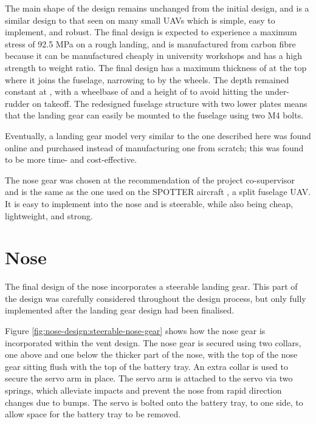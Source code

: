 \documentclass[../../main.tex]{subfiles}
\begin{document}

The main shape of the design remains unchanged from the initial design, and is a similar design to that seen on many small UAVs which is simple, easy to implement, and robust.
The final design is expected to experience a maximum stress of 92.5 MPa on a rough landing, and is manufactured from carbon fibre because it can be manufactured cheaply in university workshops and has a high strength to weight ratio.
The final design has a maximum thickness of  at the top where it joins the fuselage, narrowing to  by the wheels.
The depth remained constant at , with a wheelbase of  and a height of  to avoid hitting the under-rudder on takeoff.
The redesigned fuselage structure with two lower plates means that the landing gear can easily be mounted to the fuselage using two M4 bolts. 

Eventually, a landing gear model very similar to the one described here was found online and purchased instead of manufacturing one from scratch; this was found to be more time- and cost-effective.


The nose gear was chosen at the recommendation of the project co-supervisor and is the same as the one used on the SPOTTER aircraft \cite{spotter-19}, a  split fuselage UAV.
It is easy to implement into the nose and is steerable, while also being cheap, lightweight, and strong. 

\section{Nose} \label{sec:final-design-proposal:nose}

The final design of the nose incorporates a steerable landing gear.
This part of the design was carefully considered throughout the design process, but only fully implemented after the landing gear design had been finalised. 


Figure \ref{fig:nose-design:steerable-nose-gear} shows how the nose gear is incorporated within the vent design.
The nose gear is secured using two collars, one above and one below the thicker part of the nose, with the top of the nose gear sitting flush with the top of the battery tray.
An extra collar is used to secure the servo arm in place.
The servo arm is attached to the servo via two springs, which alleviate impacts and prevent the nose from rapid direction changes due to bumps.
The servo is bolted onto the battery tray, to one side, to allow space for the battery tray to be removed. 
\end{document}
